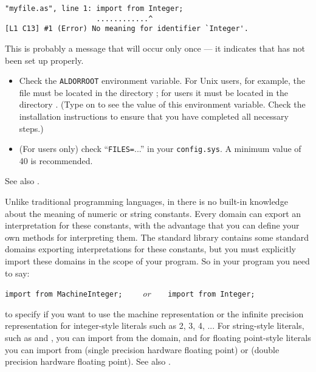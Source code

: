 {\small
\begin{verbatim}
"myfile.as", line 1: import from Integer;
                     ............^
[L1 C13] #1 (Error) No meaning for identifier `Integer'.
\end{verbatim}
}

This is probably a message that will occur only once --- it indicates
that \asharp{} has not been set up properly.
\begin{itemize}
\item Check the {\tt ALDORROOT} environment variable. For Unix
users, for \linebreak
example, the file  must be located in the directory
\linebreak {}; for \Dos{} users it must be
located in the directory .  (Type
 on \Dos{} to see the value of this environment variable.
Check the installation instructions to ensure that you have completed
all necessary steps.)

\item (For \Dos{} users only) check ``{\tt FILES=}...'' in your 
\verb"config.sys".  A minimum value of 40 is recommended.
\end{itemize}
See also .


Unlike traditional programming languages, in \asharp{} there is no
built-in knowledge about the meaning of numeric or string constants.
Every domain can export an interpretation for these constants, with the
advantage that you can define your own methods for interpreting them.
The standard \asharp{} library contains some standard domains
exporting interpretations for these constants, but you must explicitly import
these domains in the scope of your program. So in your program you need to
say:

{\small \verb"import from MachineInteger;    "}%
{\em or}{\small \verb"    import from Integer;"}

to specify if you want to use the machine representation or the
infinite
precision representation for integer-style literals such as 2, 3, 4, ...
%
%
For string-style literals, such as  and , you can
import from the  domain, and for floating point-style
literals you can import from  (single precision
hardware floating point) or  (double precision hardware
floating point).  See also .

